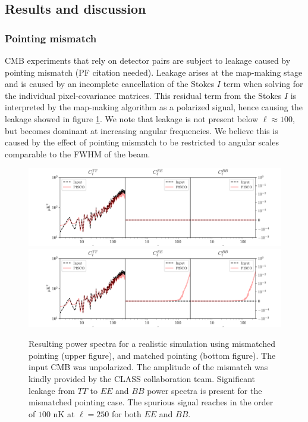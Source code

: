 \documentclass[a4paper,11pt]{article}
\begin{document}
\subsection{Results and discussion}

\subsubsection{Pointing mismatch}

CMB experiments that rely on detector pairs are subject to leakage caused by pointing mismatch (PF citation needed). Leakage arises at the map-making stage and is caused by an incomplete cancellation of the Stokes $I$ term when solving for the individual pixel-covariance matrices. This residual term from the Stokes $I$ is interpreted by the map-making algorithm as a polarized signal, hence causing the leakage showed in figure \ref{fig::pisco4class_pointingmismatch}. We note that leakage is not present below $\ell \approx 100$, but becomes dominant at increasing angular frequencies. We believe this is caused by the effect of pointing mismatch to be restricted to angular scales comparable to the FWHM of the beam. 

\begin{figure}
	\centering
	\includegraphics[width=1\textwidth]{figures/unpolCMB_r0d00_CLASS_matchedPointing_matchedBeams_ellipticalBeams.pdf}
	\includegraphics[width=1\textwidth]{figures/unpolCMB_r0d00_CLASS_mismatchedPointing_matchedBeams_ellipticalBeams.pdf}
	\caption{Resulting power spectra for a realistic simulation using mismatched pointing (upper figure), and matched pointing (bottom figure). The input CMB was unpolarized. The amplitude of the mismatch was kindly provided by the CLASS collaboration team. Significant leakage from $TT$ to $EE$ and $BB$ power spectra is present for the mismatched pointing case. The spurious signal reaches in the order of $100$ nK at $\ell = 250$ for both $EE$ and $BB$.}
	\label{fig::pisco4class_pointingmismatch}
\end{figure}
\end{document}
